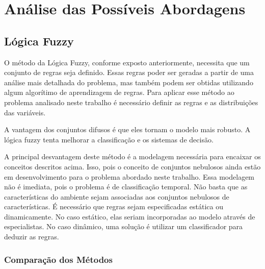 \chapter{Análise das Possíveis Abordagens}\label{cap:anal_abordagens}



\section{Lógica Fuzzy}

O método da Lógica Fuzzy, conforme exposto anteriormente, necessita que um
conjunto de regras seja definido. Essas regras poder ser geradas a partir de uma
análise mais detalhada do problema, mas também podem ser obtidas utilizando
algum algorítimo de aprendizagem de regras. Para aplicar esse método ao problema
analisado neste trabalho é necessário definir as regras e as distribuições das
variáveis.

A vantagem dos conjuntos difusos é que eles tornam o modelo mais robusto. A
lógica fuzzy tenta melhorar a classificação e os sistemas de decisão.

A principal desvantagem deste método é a modelagem necessária para encaixar os
conceitos descritos acima. Isso, pois o conceito de conjuntos nebulosos ainda
estão em desenvolvimento para o problema abordado neste trabalho. Essa modelagem
não é imediata, pois o problema é de classificação temporal. Não basta que as
características do ambiente sejam associadas aos conjuntos nebulosos de
características. É necessário que regras sejam especificadas estática ou
dinamicamente. No caso estático, elas seriam incorporadas ao modelo através de
especialistas. No caso dinâmico, uma solução é utilizar um classificador para
deduzir as regras.

\subsection{Comparação dos Métodos}

